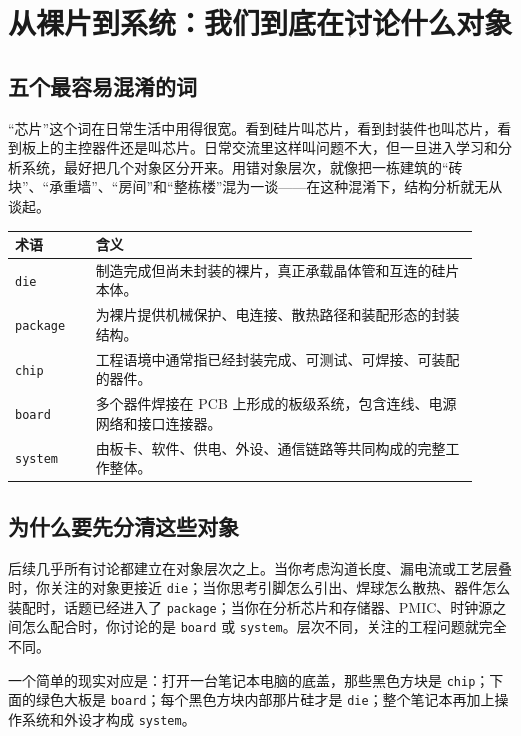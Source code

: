 \documentclass[11pt,a4paper]{article}
\begin{document}
\section{从裸片到系统：我们到底在讨论什么对象}

\subsection{五个最容易混淆的词}

``芯片''这个词在日常生活中用得很宽。看到硅片叫芯片，看到封装件也叫芯片，看到板上的主控器件还是叫芯片。日常交流里这样叫问题不大，但一旦进入学习和分析系统，最好把几个对象区分开来。用错对象层次，就像把一栋建筑的``砖块''、``承重墙''、``房间''和``整栋楼''混为一谈——在这种混淆下，结构分析就无从谈起。

\begin{center}
\begin{tabular}{p{0.16\linewidth} p{0.76\linewidth}}
\toprule
术语 & 含义 \\
\midrule
\texttt{die} & 制造完成但尚未封装的裸片，真正承载晶体管和互连的硅片本体。 \\
\texttt{package} & 为裸片提供机械保护、电连接、散热路径和装配形态的封装结构。 \\
\texttt{chip} & 工程语境中通常指已经封装完成、可测试、可焊接、可装配的器件。 \\
\texttt{board} & 多个器件焊接在 PCB 上形成的板级系统，包含连线、电源网络和接口连接器。 \\
\texttt{system} & 由板卡、软件、供电、外设、通信链路等共同构成的完整工作整体。 \\
\bottomrule
\end{tabular}
\end{center}

\subsection{为什么要先分清这些对象}

后续几乎所有讨论都建立在对象层次之上。当你考虑沟道长度、漏电流或工艺层叠时，你关注的对象更接近 \texttt{die}；当你思考引脚怎么引出、焊球怎么散热、器件怎么装配时，话题已经进入了 \texttt{package}；当你在分析芯片和存储器、PMIC、时钟源之间怎么配合时，你讨论的是 \texttt{board} 或 \texttt{system}。层次不同，关注的工程问题就完全不同。

一个简单的现实对应是：打开一台笔记本电脑的底盖，那些黑色方块是 \texttt{chip}；下面的绿色大板是 \texttt{board}；每个黑色方块内部那片硅才是 \texttt{die}；整个笔记本再加上操作系统和外设才构成 \texttt{system}。
\end{document}

